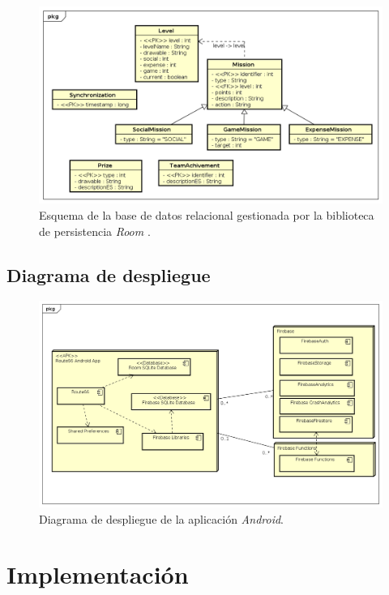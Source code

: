 \documentclass[twoside]{report}
\begin{document}
\begin{figure}[H]
\centering
\includegraphics[scale=0.5]{images/databaseRoom}
\caption{Esquema de la base de datos relacional gestionada por la biblioteca de persistencia \textit{Room} \cite{roompersistence}.}
\end{figure}

\subsection{Diagrama de despliegue}

\begin{figure}[H]
\centering
\includegraphics[scale=0.5]{images/deploymentModel}
\caption{Diagrama de despliegue de la aplicación \textit{Android}.}
\end{figure}


\section{Implementación}
\end{document}
